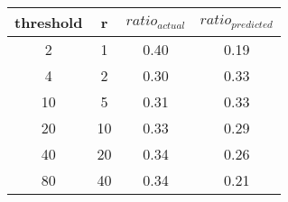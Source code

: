 \begin{tabular}[]{cccc}
\toprule
threshold & r & $ratio_{actual}$ & $ratio_{predicted}$ \\
\midrule
\phantom{0}2  & 1  & 0.40 & 0.19 \\
\phantom{0}4  & 2  & 0.30 & 0.33 \\
           10 & 5  & 0.31 & 0.33 \\
           20 & 10 & 0.33 & 0.29 \\
           40 & 20 & 0.34 & 0.26 \\
           80 & 40 & 0.34 & 0.21 \\
\bottomrule
\end{tabular}
